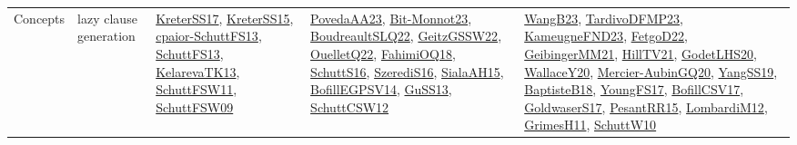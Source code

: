 {\begin{longtable}{lp{3cm}>{\raggedright}p{6cm}>{\raggedright}p{6cm}p{8cm}}
Concepts & lazy clause generation & \href{articles/KreterSS17.pdf}{KreterSS17}\cite{KreterSS17}, \href{papers/KreterSS15.pdf}{KreterSS15}\cite{KreterSS15}, \href{papers/cpaior-SchuttFS13.pdf}{cpaior-SchuttFS13}\cite{cpaior-SchuttFS13}, \href{papers/SchuttFS13.pdf}{SchuttFS13}\cite{SchuttFS13}, \href{papers/KelarevaTK13.pdf}{KelarevaTK13}\cite{KelarevaTK13}, \href{articles/SchuttFSW11.pdf}{SchuttFSW11}\cite{SchuttFSW11}, \href{papers/SchuttFSW09.pdf}{SchuttFSW09}\cite{SchuttFSW09} & \href{papers/PovedaAA23.pdf}{PovedaAA23}\cite{PovedaAA23}, \href{papers/Bit-Monnot23.pdf}{Bit-Monnot23}\cite{Bit-Monnot23}, \href{papers/BoudreaultSLQ22.pdf}{BoudreaultSLQ22}\cite{BoudreaultSLQ22}, \href{papers/GeitzGSSW22.pdf}{GeitzGSSW22}\cite{GeitzGSSW22}, \href{papers/OuelletQ22.pdf}{OuelletQ22}\cite{OuelletQ22}, \href{articles/FahimiOQ18.pdf}{FahimiOQ18}\cite{FahimiOQ18}, \href{papers/SchuttS16.pdf}{SchuttS16}\cite{SchuttS16}, \href{papers/SzerediS16.pdf}{SzerediS16}\cite{SzerediS16}, \href{papers/SialaAH15.pdf}{SialaAH15}\cite{SialaAH15}, \href{papers/BofillEGPSV14.pdf}{BofillEGPSV14}\cite{BofillEGPSV14}, \href{papers/GuSS13.pdf}{GuSS13}\cite{GuSS13}, \href{papers/SchuttCSW12.pdf}{SchuttCSW12}\cite{SchuttCSW12} & \href{papers/WangB23.pdf}{WangB23}\cite{WangB23}, \href{papers/TardivoDFMP23.pdf}{TardivoDFMP23}\cite{TardivoDFMP23}, \href{papers/KameugneFND23.pdf}{KameugneFND23}\cite{KameugneFND23}, \href{articles/FetgoD22.pdf}{FetgoD22}\cite{FetgoD22}, \href{papers/GeibingerMM21.pdf}{GeibingerMM21}\cite{GeibingerMM21}, \href{papers/HillTV21.pdf}{HillTV21}\cite{HillTV21}, \href{papers/GodetLHS20.pdf}{GodetLHS20}\cite{GodetLHS20}, \href{articles/WallaceY20.pdf}{WallaceY20}\cite{WallaceY20}, \href{papers/Mercier-AubinGQ20.pdf}{Mercier-AubinGQ20}\cite{Mercier-AubinGQ20}, \href{papers/YangSS19.pdf}{YangSS19}\cite{YangSS19}, \href{articles/BaptisteB18.pdf}{BaptisteB18}\cite{BaptisteB18}, \href{papers/YoungFS17.pdf}{YoungFS17}\cite{YoungFS17}, \href{papers/BofillCSV17.pdf}{BofillCSV17}\cite{BofillCSV17}, \href{papers/GoldwaserS17.pdf}{GoldwaserS17}\cite{GoldwaserS17}, \href{papers/PesantRR15.pdf}{PesantRR15}\cite{PesantRR15}, \href{articles/LombardiM12.pdf}{LombardiM12}\cite{LombardiM12}, \href{papers/GrimesH11.pdf}{GrimesH11}\cite{GrimesH11}, \href{papers/SchuttW10.pdf}{SchuttW10}\cite{SchuttW10}\\

\end{longtable}}
